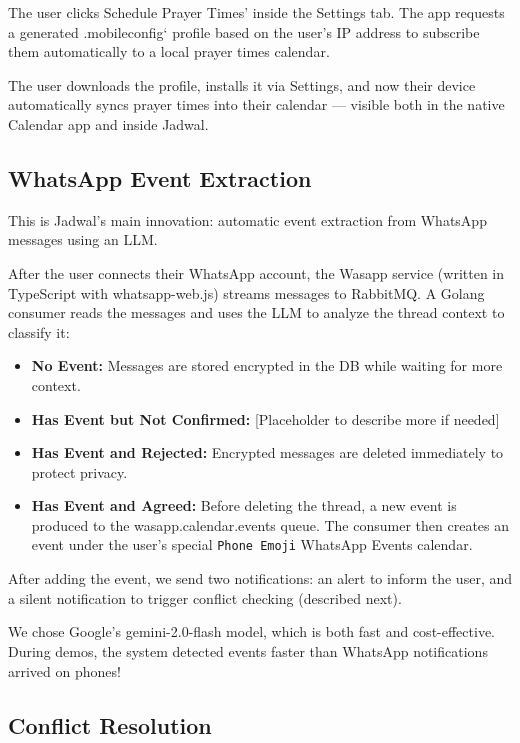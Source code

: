 The user clicks Schedule Prayer Times' inside the Settings tab. The app requests a generated .mobileconfig` profile based on the user's IP address to subscribe them automatically to a local prayer times calendar.

The user downloads the profile, installs it via Settings, and now their device automatically syncs prayer times into their calendar — visible both in the native Calendar app and inside Jadwal.

\subsection{WhatsApp Event Extraction} \label{subsec:whatsapp-event-extraction}

This is Jadwal's main innovation: automatic event extraction from WhatsApp messages using an LLM.

After the user connects their WhatsApp account, the Wasapp service (written in TypeScript with whatsapp-web.js) streams messages to RabbitMQ. A Golang consumer reads the messages and uses the LLM to analyze the thread context to classify it:

\begin{itemize} \item \textbf{No Event:} Messages are stored encrypted in the DB while waiting for more context. \item \textbf{Has Event but Not Confirmed:} [Placeholder to describe more if needed] \item \textbf{Has Event and Rejected:} Encrypted messages are deleted immediately to protect privacy. \item \textbf{Has Event and Agreed:} Before deleting the thread, a new event is produced to the wasapp.calendar.events queue. The consumer then creates an event under the user’s special \texttt{Phone Emoji} WhatsApp Events calendar. \end{itemize}

After adding the event, we send two notifications: an alert to inform the user, and a silent notification to trigger conflict checking (described next).

We chose Google’s gemini-2.0-flash model, which is both fast and cost-effective. During demos, the system detected events faster than WhatsApp notifications arrived on phones!

\subsection{Conflict Resolution} \label{subsec:conflict-resolution}

